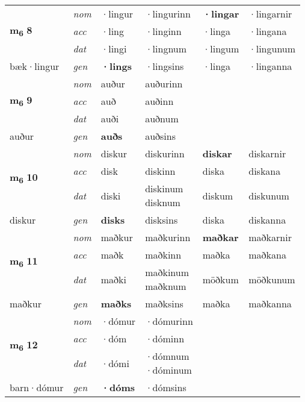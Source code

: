 \begin{longtable}[l]{X>{\footnotesize\itshape}XXXXX}
\multirow{3}{*}{{{\textbf{m{\textsubscript{6}}} \Large{\textbf{8}}}}} & nom & ·lingur & ·lingurinn & \textbf{·lingar} & ·lingarnir \\*
 & acc & ·ling & ·linginn & ·linga & ·lingana \\*
 & dat & ·lingi & ·lingnum & ·lingum & ·lingunum \\*
 {\footnotesize{bæk\allowbreak ·lingur}} & gen & \textbf{·lings} & ·lingsins & ·linga & ·linganna \\
\midrule

\multirow{3}{*}{{{\textbf{m{\textsubscript{6}}} \Large{\textbf{9}}}}} & nom & auður & auðurinn & \textbf{} &  \\*
 & acc & auð & auðinn &  &  \\*
 & dat & auði & auðnum &  &  \\*
 {\footnotesize{auður}} & gen & \textbf{auðs} & auðsins &  &  \\
\midrule

\multirow{3}{*}{{{\textbf{m{\textsubscript{6}}} \Large{\textbf{10}}}}} & nom & diskur & diskurinn & \textbf{diskar} & diskarnir \\*
 & acc & disk & diskinn & diska & diskana \\*
 & dat & diski & \specialcell{diskinum\\ disknum} & diskum & diskunum \\*
 {\footnotesize{diskur}} & gen & \textbf{disks} & disksins & diska & diskanna \\
\midrule

\multirow{3}{*}{{{\textbf{m{\textsubscript{6}}} \Large{\textbf{11}}}}} & nom & maðkur & maðkurinn & \textbf{maðkar} & maðkarnir \\*
 & acc & maðk & maðkinn & maðka & maðkana \\*
 & dat & maðki & \specialcell{maðkinum\\ maðknum} & möðkum & möðkunum \\*
 {\footnotesize{maðkur}} & gen & \textbf{maðks} & maðksins & maðka & maðkanna \\
\midrule

\multirow{3}{*}{{{\textbf{m{\textsubscript{6}}} \Large{\textbf{12}}}}} & nom & ·dómur & ·dómurinn & \textbf{} &  \\*
 & acc & ·dóm & ·dóminn &  &  \\*
 & dat & ·dómi & \specialcell{·dómnum\\  ·dóminum} &  &  \\*
 {\footnotesize{barn\allowbreak ·dómur}} & gen & \textbf{·dóms} & ·dómsins &  &  \\
\midrule


\end{longtable}
